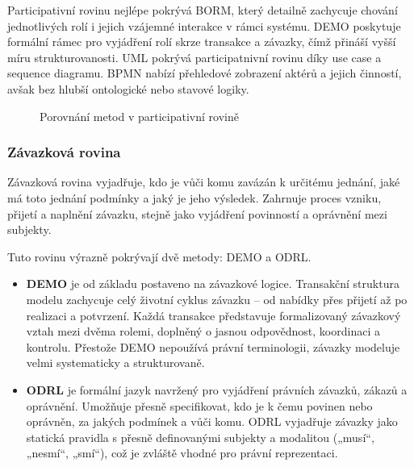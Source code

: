 Participativní rovinu nejlépe pokrývá BORM, který detailně zachycuje chování jednotlivých rolí i jejich vzájemné interakce v rámci systému. DEMO poskytuje formální rámec pro vyjádření rolí skrze transakce a závazky, čímž přináší vyšší míru strukturovanosti. UML pokrývá participatnivní rovinu díky use case a sequence diagramu. BPMN nabízí přehledové zobrazení aktérů a jejich činností, avšak bez hlubší ontologické nebo stavové logiky. 

\begin{figure}[H]
  \centering
  \caption{Porovnání metod v participativní rovině}
\end{figure}



\subsubsection{Závazková rovina}
\label{sec:zavazkova-rovina}

Závazková rovina vyjadřuje, kdo je vůči komu zavázán k určitému jednání, jaké má toto jednání podmínky a jaký je jeho výsledek. Zahrnuje proces vzniku, přijetí a naplnění závazku, stejně jako vyjádření povinností a oprávnění mezi subjekty.

Tuto rovinu výrazně pokrývají dvě metody: DEMO a ODRL.

\begin{itemize}
  \item \textbf{DEMO} je od základu postaveno na závazkové logice. Transakční struktura modelu zachycuje celý životní cyklus závazku – od nabídky přes přijetí až po realizaci a potvrzení. Každá transakce představuje formalizovaný závazkový vztah mezi dvěma rolemi, doplněný o jasnou odpovědnost, koordinaci a kontrolu. Přestože DEMO nepoužívá právní terminologii, závazky modeluje velmi systematicky a strukturovaně.

  \item \textbf{ODRL} je formální jazyk navržený pro vyjádření právních závazků, zákazů a oprávnění. Umožňuje přesně specifikovat, kdo je k čemu povinen nebo oprávněn, za jakých podmínek a vůči komu. ODRL vyjadřuje závazky jako statická pravidla s přesně definovanými subjekty a modalitou („musí“, „nesmí“, „smí“), což je zvláště vhodné pro právní reprezentaci.
\end{itemize}

